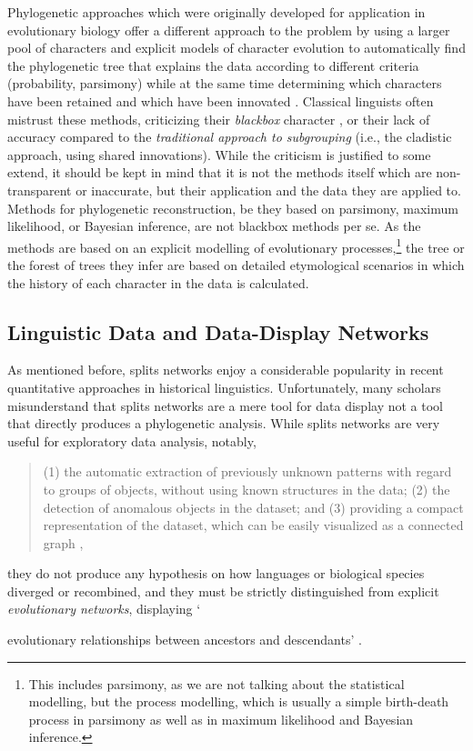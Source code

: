 \documentclass[svgnames,12pt]{scrartcl}
\begin{document}
{Phylogenetic approaches which were originally developed for application in evolutionary biology
offer a different approach to the problem by using a larger pool of characters and explicit models
of character evolution to automatically find the phylogenetic tree that explains the data according
to different criteria (probability, parsimony) while at the same time determining which characters
have been retained and which have been innovated \citep{Greenhill2012}. Classical linguists often
mistrust these methods, criticizing their \emph{blackbox} character \citep{Prokic2013b}, or their
lack of
accuracy \citep{Holm2007} compared to the \emph{traditional approach to subgrouping} (i.e., the
cladistic approach, using shared innovations). While the criticism is justified to some extend, it
should be kept in mind that it is not the methods itself which are non-transparent or inaccurate, but
their application and the data they are applied to.
Methods for phylogenetic reconstruction, be they based on parsimony, maximum likelihood, or Bayesian
inference, are not blackbox methods per se. As the methods are based on an explicit modelling of
evolutionary processes,\footnote{This includes parsimony, as we are not talking about the
statistical modelling, but the process modelling, which is usually a simple birth-death process in
parsimony as well as in maximum likelihood and Bayesian inference.} the tree or the forest of trees
they infer are based on detailed etymological scenarios in which the history of each character in
the data is calculated. 

\subsection{Linguistic Data and Data-Display Networks}
As mentioned before, splits networks enjoy a considerable popularity in recent quantitative approaches
in historical linguistics.
Unfortunately, many scholars misunderstand
that splits networks are a mere tool for data display \citep{Morrison2010} not a tool that directly
produces a phylogenetic analysis. While splits
networks are very useful for exploratory data analysis, notably, 
\begin{quote}
(1) the automatic extraction of previously unknown patterns with regard to groups of
objects, without using known structures in the data;
(2) the detection of anomalous objects in the dataset;
and (3) providing a compact representation of the
dataset, which can be easily visualized as a connected
graph \citep[2]{Morrison2014b},
\end{quote}
they do not produce any hypothesis on how languages or biological species diverged or recombined, and they must be
strictly distinguished from explicit \emph{evolutionary networks}, displaying `{evolutionary
relationships between ancestors and descendants' \citep[43]{Morrison2011}.
 
}}
\end{document}
